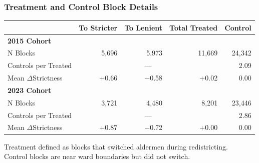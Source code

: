 \begin{frame}[label=treatment-details]
    \frametitle{Treatment and Control Block Details}
    
    \begin{center}
    \small
    \begin{tabular}{lrrrr}
    \toprule
     & To Stricter & To Lenient & Total Treated & Control \\
    \midrule
    \multicolumn{5}{l}{\textbf{2015 Cohort}} \\
    \quad N Blocks & 5,696 & 5,973 & 11,669 & 24,342 \\
    \quad Controls per Treated & \multicolumn{3}{c}{---} & 2.09 \\
    \quad Mean $\Delta$Strictness & +0.66 & $-$0.58 & +0.02 & 0.00 \\
    \midrule
    \multicolumn{5}{l}{\textbf{2023 Cohort}} \\
    \quad N Blocks & 3,721 & 4,480 & 8,201 & 23,446 \\
    \quad Controls per Treated & \multicolumn{3}{c}{---} & 2.86 \\
    \quad Mean $\Delta$Strictness & +0.87 & $-$0.72 & +0.00 & 0.00 \\
    \bottomrule
    \end{tabular}
    \end{center}
    
    \vspace{0.5em}
    \small
    Treatment defined as blocks that switched aldermen during redistricting. \\
    Control blocks are near ward boundaries but did not switch.
    
    \vfill\hfill \hyperlink{event-data}{}
\end{frame}

